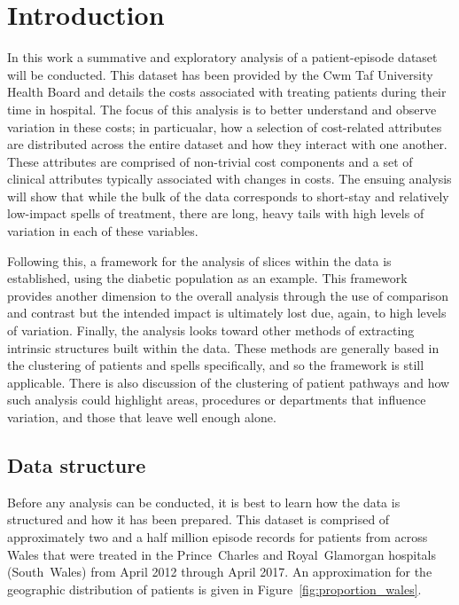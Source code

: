 \section{Introduction}\label{sec:intro}

In this work a summative and exploratory analysis of a patient-episode dataset
will be conducted. This dataset has been provided by the Cwm Taf University
Health Board and details the costs associated with treating patients during
their time in hospital. The focus of this analysis is to better understand and
observe variation in these costs; in particualar, how a selection of
cost-related attributes are distributed across the entire dataset and how
they interact with one another. These attributes are comprised of non-trivial
cost components and a set of clinical attributes typically associated with
changes in costs. The ensuing analysis will show that while the bulk of the data
corresponds to short-stay and relatively low-impact spells of treatment, there
are long, heavy tails with high levels of variation in each of these variables.

Following this, a framework for the analysis of slices within the data is
established, using the diabetic population as an example. This framework
provides another dimension to the overall analysis through the use of comparison
and contrast but the intended impact is ultimately lost due, again, to high
levels of variation. Finally, the analysis looks toward other methods of
extracting intrinsic structures built within the data. These methods are
generally based in the clustering of patients and spells specifically, and so
the framework is still applicable. There is also discussion of the clustering of
patient pathways and how such analysis could highlight areas, procedures or
departments that influence variation, and those that leave well enough alone.

\subsection{Data structure}\label{subsec:structure}

Before any analysis can be conducted, it is best to learn how the data is
structured and how it has been prepared. This dataset is comprised of
approximately two and a half million episode records for patients from across
Wales that were treated in the Prince~Charles and Royal~Glamorgan hospitals
(South~Wales) from April 2012 through April 2017. An approximation for the
geographic distribution of patients is given in
Figure~\ref{fig:proportion_wales}.

